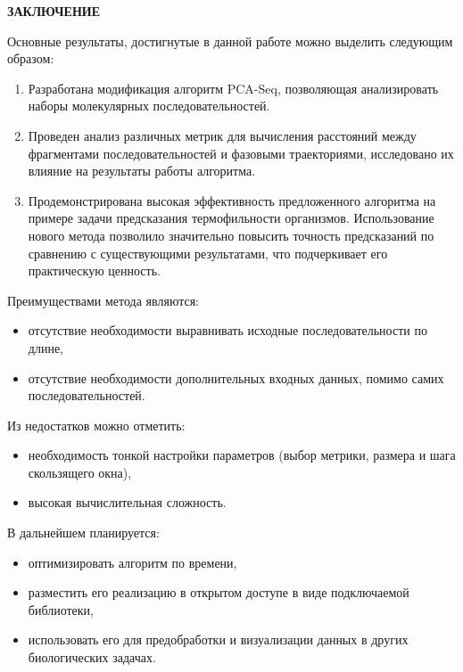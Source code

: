 \newpage
\begin{center}
  \textbf{\large ЗАКЛЮЧЕНИЕ}
\end{center}

Основные результаты, достигнутые в данной работе можно выделить следующим образом:

\begin{enumerate}
  \item Разработана модификация алгоритм PCA-Seq, позволяющая анализировать наборы молекулярных последовательностей.
  \item Проведен анализ различных метрик для вычисления расстояний между фрагментами последовательностей и фазовыми траекториями, исследовано их влияние на результаты работы алгоритма.
  \item Продемонстрирована высокая эффективность предложенного алгоритма на примере задачи предсказания термофильности организмов. Использование нового метода позволило значительно повысить точность предсказаний по сравнению с существующими результатами, что подчеркивает его практическую ценность.
\end{enumerate}

Преимуществами метода являются:

\begin{itemize}
  \item отсутствие необходимости выравнивать исходные последовательности по длине,
  \item отсутствие необходимости дополнительных входных данных, помимо самих последовательностей.
\end{itemize}

Из недостатков можно отметить:

\begin{itemize}
  \item необходимость тонкой настройки параметров (выбор метрики, размера и шага скользящего окна),
  \item высокая вычислительная сложность.
\end{itemize}

В дальнейшем планируется:
\begin{itemize}
  \item оптимизировать алгоритм по времени,
  \item разместить его реализацию в открытом доступе в виде подключаемой библиотеки,
  \item использовать его для предобработки и визуализации данных в других биологических задачах.
\end{itemize}
